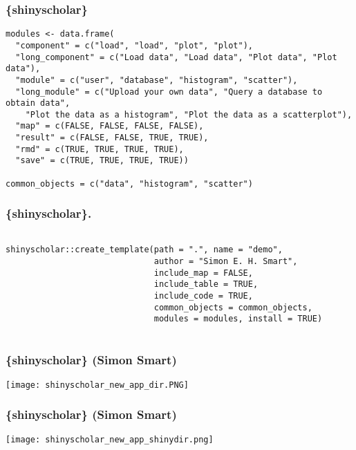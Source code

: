 \documentclass[handout, aspectratio = 169, xcolor={dvipsnames}]{beamer}
\begin{document}
\begin{frame}[fragile]
\frametitle{\{shinyscholar\}}
\footnotesize{
\vspace{1mm}



\renewcommand{\FancyVerbFormatLine}[1]{%
   \ifnum\value{FancyVerbLine}=4\color{cyan}#1%
   \else #1\fi}

\begin{Verbatim}
modules <- data.frame(
  "component" = c("load", "load", "plot", "plot"),
  "long_component" = c("Load data", "Load data", "Plot data", "Plot data"),
  "module" = c("user", "database", "histogram", "scatter"),
  "long_module" = c("Upload your own data", "Query a database to obtain data",
    "Plot the data as a histogram", "Plot the data as a scatterplot"),
  "map" = c(FALSE, FALSE, FALSE, FALSE),
  "result" = c(FALSE, FALSE, TRUE, TRUE),
  "rmd" = c(TRUE, TRUE, TRUE, TRUE),
  "save" = c(TRUE, TRUE, TRUE, TRUE))

common_objects = c("data", "histogram", "scatter")

\end{Verbatim}
}
\end{frame} 


\begin{frame}[fragile]
\frametitle{\{shinyscholar\}.}
\footnotesize{
\vspace{1mm}
\begin{Verbatim}

shinyscholar::create_template(path = ".", name = "demo", 
                              author = "Simon E. H. Smart",
                              include_map = FALSE, 
                              include_table = TRUE, 
                              include_code = TRUE, 
                              common_objects = common_objects, 
                              modules = modules, install = TRUE)


\end{Verbatim}
}
\end{frame} 


\begin{frame}
\frametitle{\{shinyscholar\} (Simon Smart)}
\texttt{[image: shinyscholar\_new\_app\_dir.PNG]}
\end{frame} 


\begin{frame}
\frametitle{\{shinyscholar\} (Simon Smart)}
\texttt{[image: shinyscholar\_new\_app\_shinydir.png]}
\end{frame} 
\end{document}
